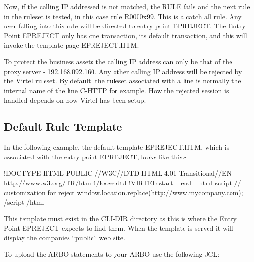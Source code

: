 \documentclass[letterpaper,10pt,english]{sphinxmanual}
\begin{document}
Now, if the calling IP addressed is not matched, the RULE fails and the next rule in the ruleset is tested, in this case rule R0000x99. This is a catch all rule. Any user falling into this rule will be directed to entry point EPREJECT. The Entry Point EPREJECT only has one transaction, its default transaction, and this will invoke the template page
EPREJECT.HTM.

To protect the business assets the calling IP address can only be that of the proxy server - 192.168.092.160. Any other calling IP address will be rejected by the Virtel ruleset. By default, the ruleset associated with a line is normally the internal name of the line \textendash{} C-HTTP for example. How the rejected session is handled depends on how Virtel has been setup.


\subsection{Default Rule Template}
\label{\detokenize{connectivity_guide:default-rule-template}}\label{\detokenize{connectivity_guide:index-180}}
In the following example, the default template EPREJECT.HTM, which is associated with the entry point EPREJECT, looks like this:-

\begin{sphinxVerbatim}[commandchars=\\\{\}]
\PYGZlt{}!DOCTYPE HTML PUBLIC \PYGZdq{}\PYGZhy{}//W3C//DTD HTML 4.01 Transitional//EN\PYGZdq{}
\PYGZdq{}http://www.w3.org/TR/html4/loose.dtd\PYGZdq{}\PYGZgt{}
\PYGZlt{}!\PYGZhy{}\PYGZhy{}VIRTEL start=\PYGZdq{}\PYGZob{}\PYGZob{}\PYGZob{}\PYGZdq{} end=\PYGZdq{}\PYGZcb{}\PYGZcb{}\PYGZcb{}\PYGZdq{} \PYGZhy{}\PYGZhy{}\PYGZgt{}
\PYGZlt{}html\PYGZgt{}
\PYGZlt{}script\PYGZgt{}
// customization for reject
window.location.replace(\PYGZdq{}http://www.mycompany.com\PYGZdq{});
\PYGZlt{}/script\PYGZgt{}
\PYGZlt{}/html\PYGZgt{}
\end{sphinxVerbatim}

This template must exist in the CLI-DIR directory as this is where the Entry Point EPREJECT expects to find them. When the template is served it will display the companies “public” web site.

To upload the ARBO statements to your ARBO use the following JCL:-
\end{document}
